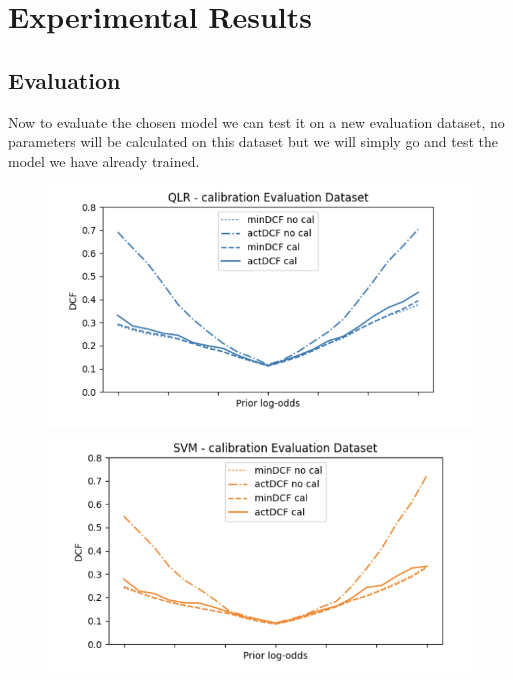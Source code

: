 \documentclass{article}
\begin{document}
\section{Experimental Results}
\subsection{Evaluation}
Now to evaluate the chosen model we can test it on a new evaluation dataset, no parameters will be calculated on this dataset but we will simply go and test the model we have already trained.
\begin{figure}[H]
    \centering
    \begin{minipage}{.4\textwidth}
        \centering
        \includegraphics[width=\linewidth]{./img/EVAL1.png}
    \end{minipage}%
    \begin{minipage}{.4\textwidth}
        \centering
        \includegraphics[width=\linewidth]{./img/EVAL2.png}
    \end{minipage}

\end{figure}
\end{document}
